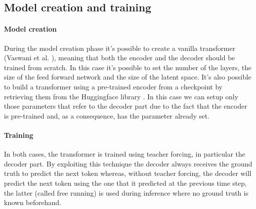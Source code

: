 \subsection{Model creation and training}

\paragraph{Model creation} During the model creation phase it's possible to create a vanilla transformer (Vaswani et al. \cite{vaswani2017attention}), meaning that both the encoder and the decoder should be trained from scratch. In this case it's possible to set the number of the layers, the size of the feed forward network and the size of the latent space. It's also possible to build a transformer using a pre-trained encoder from a checkpoint by retrieving them from the Huggingface library \cite{huggingface_co}. In this case we can setup only those parameters that refer to the decoder part due to the fact that the encoder is pre-trained and, as a consequence, has the parameter already set.

\paragraph{Training}In both cases, the transformer is trained using teacher forcing, in particular the decoder part. By exploiting this technique the decoder always receives the ground truth to predict the next token whereas, without teacher forcing, the decoder will predict the next token using the one that it predicted at the previous time step, the latter (called free running) is used during inference where no ground truth is known beforehand.


